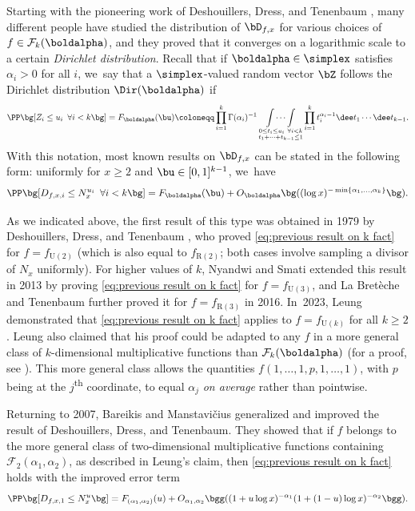 Starting with the pioneering work of Deshouillers, Dress, and Tenenbaum \cite{DDT79}, many different people have studied the distribution of $\bD_{f, x}$ for various choices of $f \in \mathcal F_k(\boldalpha)$, and they proved that it converges on a logarithmic scale to a certain {\it Dirichlet distribution}. Recall that if $\boldalpha \in \simplex$ satisfies $\alpha_i > 0$ for all $i$, we~say that a $\simplex$-valued random vector $\bZ$ follows the Dirichlet distribution $\Dir(\boldalpha)$ if
\[
\PP\bg[Z_i \le u_i\ \, \forall i<k\bg] = F_{\boldalpha}(\bu) \coloneqq \prod_{i=1}^{k} \Gamma(\alpha_i)^{-1} \mathop{\int\cdots\int}\limits_{\substack{0 \le t_i \le u_i \ \forall i < k \\ t_1 + \cdots + t_{k-1} \le 1}} \prod_{i=1}^k t_i^{\alpha_i - 1} \dee t_1\cdots \dee t_{k-1}.
\]
With this notation, most known results on $\bD_{f, x}$ can be stated in the following form: uniformly for $x \ge 2$ and $\bu \in [0, 1]^{k-1}$, we~have
\begin{equation}
\label{eq:previous result on k fact}
\PP\bg[D_{f, x, i} \le N_x^{u_i}\ \, \forall i < k\bg] = F_{\boldalpha}(\bu) + O_{\boldalpha}\bg((\log x)^{-\min\{\alpha_1, \ldots, \alpha_{k}\}}\bg).
\end{equation}

As we indicated above, the first result of this type was obtained in 1979 by Deshouillers, Dress, and Tenenbaum \cite{DDT79}, who proved \eqref{eq:previous result on k fact} for $f = f_{\mathrm U(2)}$ (which is also equal to $f_{\mathrm R(2)}$; both cases involve sampling a divisor of $N_x$ uniformly). For higher values of $k$, Nyandwi and Smati \cite{NyandwiSmati13} extended this result in 2013 by proving \eqref{eq:previous result on k fact} for $f = f_{\mathrm U(3)}$, and La Bretèche and Tenenbaum \cite{delaBretecheTenenbaum16} further proved it for $f = f_{\mathrm R(3)}$ in 2016. In~2023, Leung \cite{Ken22} demonstrated that \eqref{eq:previous result on k fact} applies to $f = f_{\mathrm U(k)}$ for all $k \ge 2$. Leung also claimed that his proof could be adapted to any $f$ in a more general class of $k$-dimensional multiplicative functions than $\mathcal F_k(\boldalpha)$ (for a proof, see \cite{KenWeb24}). This more general class allows the quantities $f(1, \ldots, 1, p, 1, \ldots, 1)$, with $p$ being at the $j$\textsuperscript{th} coordinate, to equal $\alpha_j$ {\it on average} rather than pointwise.

Returning to 2007, Bareikis and Manstavi\v{c}ius \cite{BareikisManstavicius07} generalized and improved the result of Deshouillers, Dress, and Tenenbaum. They showed that if $f$ belongs to the more general class of two-dimensional multiplicative functions containing $\mathcal F_2(\alpha_1, \alpha_2)$, as described in Leung's claim, then \eqref{eq:previous result on k fact} holds with the improved error term
\[
\PP\bg[D_{f, x, 1} \le N_x^u\bg] = F_{(\alpha_1,\alpha_2)}(u) + O_{\alpha_1, \alpha_2}\bgg((1 + u\log x)^{-\alpha_1}(1 + (1-u)\log x)^{-\alpha_2}\bgg).
\]

